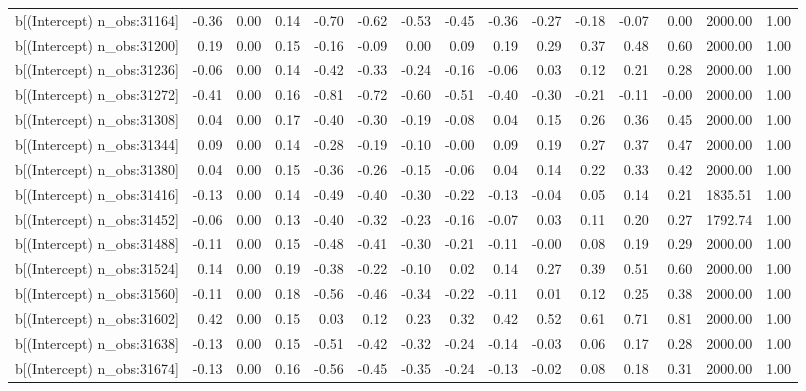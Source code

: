 \begin{table}[ht]
\begin{tabular}{rrrrrrrrrrrrrrr}
  b[(Intercept) n\_obs:31164] & -0.36 & 0.00 & 0.14 & -0.70 & -0.62 & -0.53 & -0.45 & -0.36 & -0.27 & -0.18 & -0.07 & 0.00 & 2000.00 & 1.00 \\ 
  b[(Intercept) n\_obs:31200] & 0.19 & 0.00 & 0.15 & -0.16 & -0.09 & 0.00 & 0.09 & 0.19 & 0.29 & 0.37 & 0.48 & 0.60 & 2000.00 & 1.00 \\ 
  b[(Intercept) n\_obs:31236] & -0.06 & 0.00 & 0.14 & -0.42 & -0.33 & -0.24 & -0.16 & -0.06 & 0.03 & 0.12 & 0.21 & 0.28 & 2000.00 & 1.00 \\ 
  b[(Intercept) n\_obs:31272] & -0.41 & 0.00 & 0.16 & -0.81 & -0.72 & -0.60 & -0.51 & -0.40 & -0.30 & -0.21 & -0.11 & -0.00 & 2000.00 & 1.00 \\ 
  b[(Intercept) n\_obs:31308] & 0.04 & 0.00 & 0.17 & -0.40 & -0.30 & -0.19 & -0.08 & 0.04 & 0.15 & 0.26 & 0.36 & 0.45 & 2000.00 & 1.00 \\ 
  b[(Intercept) n\_obs:31344] & 0.09 & 0.00 & 0.14 & -0.28 & -0.19 & -0.10 & -0.00 & 0.09 & 0.19 & 0.27 & 0.37 & 0.47 & 2000.00 & 1.00 \\ 
  b[(Intercept) n\_obs:31380] & 0.04 & 0.00 & 0.15 & -0.36 & -0.26 & -0.15 & -0.06 & 0.04 & 0.14 & 0.22 & 0.33 & 0.42 & 2000.00 & 1.00 \\ 
  b[(Intercept) n\_obs:31416] & -0.13 & 0.00 & 0.14 & -0.49 & -0.40 & -0.30 & -0.22 & -0.13 & -0.04 & 0.05 & 0.14 & 0.21 & 1835.51 & 1.00 \\ 
  b[(Intercept) n\_obs:31452] & -0.06 & 0.00 & 0.13 & -0.40 & -0.32 & -0.23 & -0.16 & -0.07 & 0.03 & 0.11 & 0.20 & 0.27 & 1792.74 & 1.00 \\ 
  b[(Intercept) n\_obs:31488] & -0.11 & 0.00 & 0.15 & -0.48 & -0.41 & -0.30 & -0.21 & -0.11 & -0.00 & 0.08 & 0.19 & 0.29 & 2000.00 & 1.00 \\ 
  b[(Intercept) n\_obs:31524] & 0.14 & 0.00 & 0.19 & -0.38 & -0.22 & -0.10 & 0.02 & 0.14 & 0.27 & 0.39 & 0.51 & 0.60 & 2000.00 & 1.00 \\ 
  b[(Intercept) n\_obs:31560] & -0.11 & 0.00 & 0.18 & -0.56 & -0.46 & -0.34 & -0.22 & -0.11 & 0.01 & 0.12 & 0.25 & 0.38 & 2000.00 & 1.00 \\ 
  b[(Intercept) n\_obs:31602] & 0.42 & 0.00 & 0.15 & 0.03 & 0.12 & 0.23 & 0.32 & 0.42 & 0.52 & 0.61 & 0.71 & 0.81 & 2000.00 & 1.00 \\ 
  b[(Intercept) n\_obs:31638] & -0.13 & 0.00 & 0.15 & -0.51 & -0.42 & -0.32 & -0.24 & -0.14 & -0.03 & 0.06 & 0.17 & 0.28 & 2000.00 & 1.00 \\ 
  b[(Intercept) n\_obs:31674] & -0.13 & 0.00 & 0.16 & -0.56 & -0.45 & -0.35 & -0.24 & -0.13 & -0.02 & 0.08 & 0.18 & 0.31 & 2000.00 & 1.00 \\ 

\end{tabular}
\end{table}
